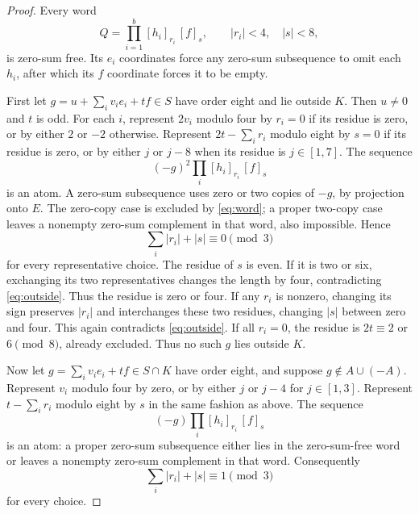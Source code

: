 \documentclass[11pt]{article}
\theoremstyle{definition}
\begin{document}
\begin{proof}
Every word
\begin{equation}\label{eq:word}
 Q=\prod_{i=1}^b[h_i]_{r_i}\,[f]_s,
 \qquad |r_i|<4,\quad |s|<8,
\end{equation}
is zero-sum free. Its $e_i$ coordinates force any zero-sum subsequence to omit each $h_i$, after which its $f$ coordinate forces it to be empty.

First let $g=u+\sum_i v_i e_i+t f\in S$ have order eight and lie outside $K$. Then $u\neq0$ and $t$ is odd. For each $i$, represent $2v_i$ modulo four by $r_i=0$ if its residue is zero, or by either $2$ or $-2$ otherwise. Represent $2t-\sum_i r_i$ modulo eight by $s=0$ if its residue is zero, or by either $j$ or $j-8$ when its residue is $j\in[1,7]$.
The sequence
\[
 (-g)^2\prod_i[h_i]_{r_i}\,[f]_s
\]
is an atom. A zero-sum subsequence uses zero or two copies of $-g$, by projection onto $E$. The zero-copy case is excluded by \eqref{eq:word}; a proper two-copy case leaves a nonempty zero-sum complement in that word, also impossible. Hence
\begin{equation}\label{eq:outside}
 \sum_i|r_i|+|s|\equiv0\pmod3
\end{equation}
for every representative choice.
The residue of $s$ is even. If it is two or six, exchanging its two representatives changes the length by four, contradicting \eqref{eq:outside}. Thus the residue is zero or four. If any $r_i$ is nonzero, changing its sign preserves $|r_i|$ and interchanges these two residues, changing $|s|$ between zero and four. This again contradicts \eqref{eq:outside}. If all $r_i=0$, the residue is $2t\equiv2$ or $6\pmod8$, already excluded. Thus no such $g$ lies outside $K$.

Now let $g=\sum_i v_i e_i+t f\in S\cap K$ have order eight, and suppose $g\notin A\cup(-A)$. Represent $v_i$ modulo four by zero, or by either $j$ or $j-4$ for $j\in[1,3]$. Represent $t-\sum_i r_i$ modulo eight by $s$ in the same fashion as above. The sequence
\[
 (-g)\prod_i[h_i]_{r_i}\,[f]_s
\]
is an atom: a proper zero-sum subsequence either lies in the zero-sum-free word or leaves a nonempty zero-sum complement in that word. Consequently
\begin{equation}\label{eq:inside}
 \sum_i|r_i|+|s|\equiv1\pmod3
\end{equation}
for every choice.


\end{proof}
\end{document}
